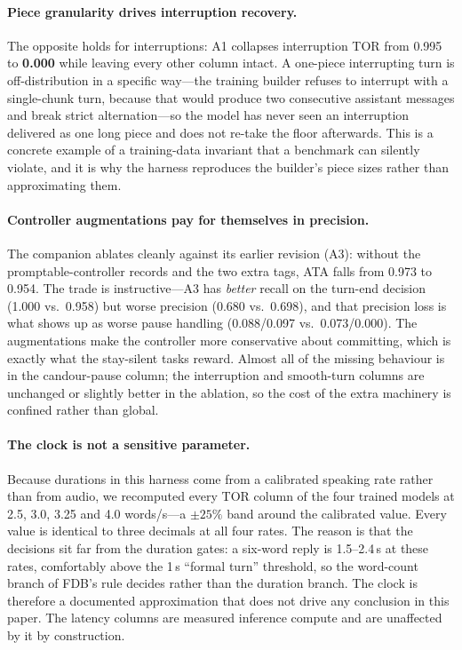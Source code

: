 \documentclass[conference]{IEEEtran}
\begin{document}
\paragraph{Piece granularity drives interruption recovery.} The opposite holds for
interruptions: A1 collapses interruption TOR from 0.995 to \textbf{0.000} while
leaving every other column intact. A one-piece interrupting turn is
off-distribution in a specific way---the training builder refuses to interrupt with
a single-chunk turn, because that would produce two consecutive assistant messages
and break strict alternation---so the model has never seen an interruption delivered
as one long piece and does not re-take the floor afterwards. This is a concrete
example of a training-data invariant that a benchmark can silently violate, and it
is why the harness reproduces the builder's piece sizes rather than approximating
them.

\paragraph{Controller augmentations pay for themselves in precision.} The companion
ablates cleanly against its earlier revision (A3): without the promptable-controller
records and the two extra tags, ATA falls from 0.973 to 0.954. The trade is
instructive---A3 has \emph{better} recall on the turn-end decision (1.000 vs.\ 0.958)
but worse precision (0.680 vs.\ 0.698), and that precision loss is what shows up as
worse pause handling (0.088/0.097 vs.\ 0.073/0.000). The augmentations make the
controller more conservative about committing, which is exactly what the
stay-silent tasks reward. Almost all of the missing behaviour is in the candour-pause
column; the interruption and smooth-turn columns are unchanged or slightly better in
the ablation, so the cost of the extra machinery is confined rather than global.

\paragraph{The clock is not a sensitive parameter.} Because durations in this
harness come from a calibrated speaking rate rather than from audio, we recomputed
every TOR column of the four trained models at 2.5, 3.0, 3.25 and 4.0 words/s---a
$\pm25\%$ band around the calibrated value. Every value is identical to three
decimals at all four rates. The reason is that the decisions sit far from the
duration gates: a six-word reply is 1.5--2.4\,s at these rates, comfortably above
the 1\,s ``formal turn'' threshold, so the word-count branch of FDB's rule decides
rather than the duration branch. The clock is therefore a documented approximation
that does not drive any conclusion in this paper. The latency columns are measured
inference compute and are unaffected by it by construction.
\end{document}
